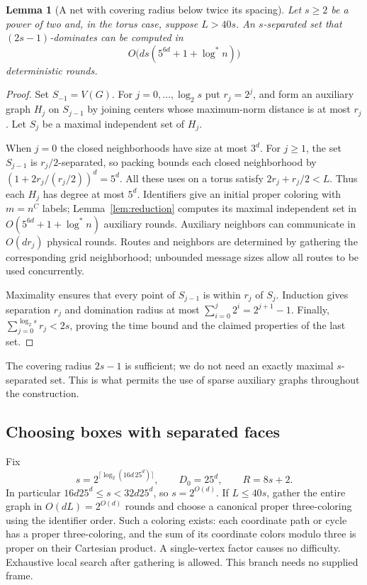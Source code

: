 \documentclass[11pt]{article}
\newtheorem{lemma}[theorem]{Lemma}
\theoremstyle{definition}\newtheorem{definition}[theorem]{Definition}
\theoremstyle{remark}\newtheorem{remark}[theorem]{Remark}
\newcommand{\ls}{\log^*}
\begin{document}
\begin{lemma}[A net with covering radius below twice its spacing]
\label{lem:net}
Let $s\ge2$ be a power of two and, in the torus case, suppose
$L>40s$. An $s$-separated set that $(2s-1)$-dominates can be
computed in
\[
                    O\bigl(ds(5^{6d}+1+\ls n)\bigr)
\]
deterministic rounds.
\end{lemma}

\begin{proof}
Set $S_{-1}=V(G)$. For $j=0,\ldots,\log_2s$ put $r_j=2^j$,
and form an auxiliary graph $H_j$ on $S_{j-1}$ by joining centers
whose maximum-norm distance is at most $r_j$. Let $S_j$ be a
maximal independent set of $H_j$.

When $j=0$ the closed neighborhoods have size at most $3^d$.
For $j\ge1$, the set $S_{j-1}$ is $r_j/2$-separated, so packing
bounds each closed neighborhood by
$(1+2r_j/(r_j/2))^d=5^d$. All these uses on a torus satisfy
$2r_j+r_j/2<L$. Thus each $H_j$ has degree at most $5^d$.
Identifiers give an initial proper coloring with $m=n^C$ labels;
Lemma~\ref{lem:reduction} computes its maximal independent set in
$O(5^{6d}+1+\ls n)$ auxiliary rounds. Auxiliary neighbors can
communicate in $O(dr_j)$ physical rounds. Routes and neighbors
are determined by gathering the corresponding grid neighborhood;
unbounded message sizes allow all routes to be used concurrently.

Maximality ensures that every point of $S_{j-1}$ is within $r_j$
of $S_j$. Induction gives separation $r_j$ and domination radius
at most $\sum_{i=0}^j2^i=2^{j+1}-1$. Finally,
$\sum_{j=0}^{\log_2s}r_j<2s$, proving the time bound and the
claimed properties of the last set.
\end{proof}

The covering radius $2s-1$ is sufficient; we do not need an exactly
maximal $s$-separated set. This is what permits the use of sparse
auxiliary graphs throughout the construction.

\subsection{Choosing boxes with separated faces}\label{sec:boxes}

Fix
\begin{equation}\label{eq:upperparameters}
 s=2^{\lceil\log_2(16d\,25^d)\rceil},\qquad
 D_0=25^d,\qquad R=8s+2.
\end{equation}
In particular $16d25^d\le s<32d25^d$, so $s=2^{O(d)}$.
If $L\le40s$, gather the entire graph in $O(dL)=2^{O(d)}$
rounds and choose a canonical proper three-coloring using the
identifier order. Such a coloring exists: each coordinate path
or cycle has a proper three-coloring, and the sum of its coordinate
colors modulo three is proper on their Cartesian product. A
single-vertex factor causes no difficulty. Exhaustive local search
after gathering is allowed. This branch needs no supplied frame.
\end{document}
